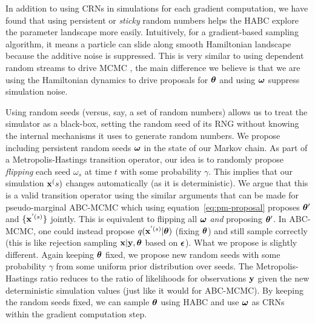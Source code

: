 \documentclass[]{article}
\begin{document}
In addition to using CRNs in simulations for each gradient computation, we have found that using persistent or {\em sticky} random numbers helps the HABC explore the parameter landscape more easily.  Intuitively, for a gradient-based sampling algorithm, it means a particle can slide along smooth Hamiltonian landscape because    the additive noise is suppressed.  This is very similar to using dependent random streams to drive MCMC \cite{Murray2012,Neal2012}, the main difference we believe is that we are using the Hamiltonian dynamics to drive proposals for ${\bm \theta}$ and using ${\bm \omega}$ suppress simulation noise.

  
Using random seeds (versus, say, a set of random numbers) allows us to treat the simulator as a black-box, setting the random seed of its RNG without knowing the internal mechanisms it uses to generate random numbers.  We propose including persistent random seeds ${\bm \omega}$ in the state of our Markov chain.    As part of a Metropolis-Hastings transition operator, our idea is to randomly propose {\em flipping} each seed $\omega_s$ at time $t$ with some probability $\gamma$.  This implies that our simulation ${\bf x}^(s)$ changes automatically (as it is deterministic).  We argue that this is a valid transition operator using the similar arguments that can be made for pseudo-marginal ABC-MCMC which using equation~\ref{eq:pm-proposal} proposes ${\bm \theta^{\prime}}$ and $\{ {\bf x}^{'(s)}\}$ jointly.  
This is equivalent to flipping all ${\bm \omega}$ {\em and} proposing ${\bm \theta^{\prime}}$.  In ABC-MCMC, one could instead propose $q({\bf x}^{'(s)} | {\bm \theta})$ (fixing ${\bm \theta}$) and still sample correctly (this is like rejection sampling ${\bf x} | {\bf y}, {\bm \theta}$ based on ${\bm {\epsilon}}$).  What we propose is slightly different.  Again keeping ${\bm \theta}$ fixed, we propose new random seeds with some probability $\gamma$ from some uniform prior distribution over seeds.  The Metropolis-Hastings ratio reduces to the ratio of likelihoods for observations ${\bf y}$ given the new deterministic simulation values (just like it would for ABC-MCMC).  By keeping the random seeds fixed, we can sample ${\bm \theta}$ using HABC and use ${\bm \omega}$ as CRNs within the gradient computation step.
\end{document}
